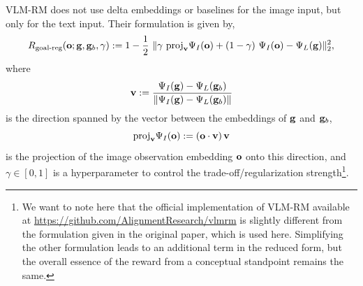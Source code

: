 VLM-RM does not use delta embeddings or baselines for the image input, but only for the text input.
Their formulation is given by,
\begin{equation}
    \label{eq:vlmrm}
    R_{\text{goal-reg}}(\bfo; \bfg, \bfg_b, \gamma) := 1 - \dfrac{1}{2}\ \norm{\gamma\ \text{proj}_{\bfv}\Psi_I(\bfo) + (1 - \gamma)\ \Psi_I(\bfo) - \Psi_L(\bfg)}^2_2,
\end{equation}
where \[\mathbf{v} := \frac{\Psi_I(\mathbf{g}) - \Psi_L(\mathbf{g}_b)}{\lVert\Psi_I(\mathbf{g}) - \Psi_L(\mathbf{g}_b)\rVert}\] is the direction spanned by the vector between the embeddings of \(\mathbf{g}\) and \(\mathbf{g}_b\), \[\text{proj}_{\mathbf{v}}\Psi_I(\mathbf{o}) := (\mathbf{o} \cdot \mathbf{v})\,\mathbf{v}\] is the projection of the image observation embedding \(\mathbf{o}\) onto this direction, and \(\gamma \in [0, 1]\) is a hyperparameter to control the trade-off/regularization strength\footnote{We want to note here that the official implementation of VLM-RM available at \url{https://github.com/AlignmentResearch/vlmrm} is slightly different from the formulation given in the original paper, which is used here. Simplifying the other formulation leads to an additional term in the reduced form, but the overall essence of the reward from a conceptual standpoint remains the same.}.
% 
\vspace{-1.5pt}

